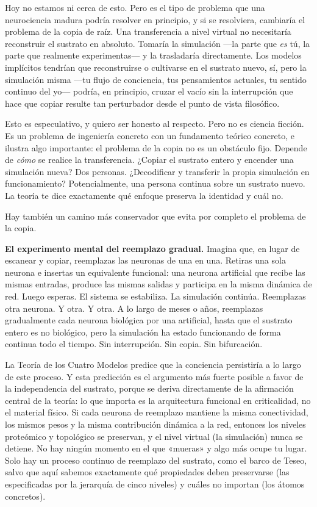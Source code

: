\documentclass[11pt, twoside, openright]{book}
\begin{document}
Hoy no estamos ni cerca de esto. Pero es el tipo de problema que una neurociencia madura podría resolver en principio, y si se resolviera, cambiaría el problema de la copia de raíz. Una transferencia a nivel virtual no necesitaría reconstruir el sustrato en absoluto. Tomaría la simulación ---la parte que \textit{es} tú, la parte que realmente experimentas--- y la trasladaría directamente. Los modelos implícitos tendrían que reconstruirse o cultivarse en el sustrato nuevo, sí, pero la simulación misma ---tu flujo de conciencia, tus pensamientos actuales, tu sentido continuo del yo--- podría, en principio, cruzar el vacío sin la interrupción que hace que copiar resulte tan perturbador desde el punto de vista filosófico.

Esto es especulativo, y quiero ser honesto al respecto. Pero no es ciencia ficción. Es un problema de ingeniería concreto con un fundamento teórico concreto, e ilustra algo importante: el problema de la copia no es un obstáculo fijo. Depende de \textit{cómo} se realice la transferencia. ¿Copiar el sustrato entero y encender una simulación nueva? Dos personas. ¿Decodificar y transferir la propia simulación en funcionamiento? Potencialmente, una persona continua sobre un sustrato nuevo. La teoría te dice exactamente qué enfoque preserva la identidad y cuál no.

Hay también un camino más conservador que evita por completo el problema de la copia.

\textbf{El experimento mental del reemplazo gradual.} Imagina que, en lugar de escanear y copiar, reemplazas las neuronas de una en una. Retiras una sola neurona e insertas un equivalente funcional: una neurona artificial que recibe las mismas entradas, produce las mismas salidas y participa en la misma dinámica de red. Luego esperas. El sistema se estabiliza. La simulación continúa. Reemplazas otra neurona. Y otra. Y otra. A lo largo de meses o años, reemplazas gradualmente cada neurona biológica por una artificial, hasta que el sustrato entero es no biológico, pero la simulación ha estado funcionando de forma continua todo el tiempo. Sin interrupción. Sin copia. Sin bifurcación.

La Teoría de los Cuatro Modelos predice que la conciencia persistiría a lo largo de este proceso. Y esta predicción es el argumento más fuerte posible a favor de la independencia del sustrato, porque se deriva directamente de la afirmación central de la teoría: lo que importa es la arquitectura funcional en criticalidad, no el material físico. Si cada neurona de reemplazo mantiene la misma conectividad, los mismos pesos y la misma contribución dinámica a la red, entonces los niveles proteómico y topológico se preservan, y el nivel virtual (la simulación) nunca se detiene. No hay ningún momento en el que «mueras» y algo más ocupe tu lugar. Solo hay un proceso continuo de reemplazo del sustrato, como el barco de Teseo, salvo que aquí sabemos exactamente qué propiedades deben preservarse (las especificadas por la jerarquía de cinco niveles) y cuáles no importan (los átomos concretos).
\end{document}
